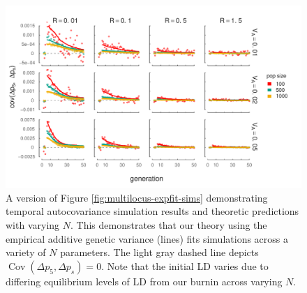\documentclass[11pt]{article}
\DeclareMathOperator{\cov}{Cov}
\begin{document}
\begin{figure}[!ht]
  \centering
  \includegraphics{./images/sim-pred-covs-varyn.pdf}

  \caption{A version of Figure \ref{fig:multilocus-expfit-sims} demonstrating
    temporal autocovariance simulation results and theoretic predictions with
    varying $N$. This demonstrates that our theory using the empirical additive
    genetic variance (lines) fits simulations across a variety of $N$
    parameters.  The light gray dashed line depicts $\cov(\Delta p_5, \Delta p_s) =
  0$. Note that the initial LD varies due to differing equilibrium levels of
LD from our burnin across varying $N$.}

  \label{fig:multilocus-expfit-sims-varyn}
\end{figure}
\end{document}
